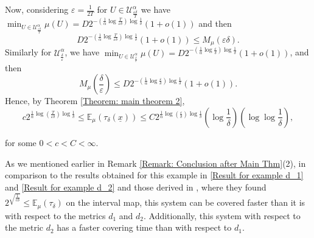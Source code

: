 \documentclass[11pt, reqno]{amsart}
\theoremstyle{plain}%
\theoremstyle{definition}
\theoremstyle{definition}
\def\U{\ensuremath{\mathcal U}}
\def\E{\mathbb E}
\def\ulx{\underline{x}}
\numberwithin{equation}{section}
\begin{document}
Now, considering $\varepsilon=\frac{1}{2T}$ for $U\in\U_{\frac{\varepsilon\delta}{T}}^\alpha$ we have $\min_{ U\in\U_{\frac{\varepsilon\delta}{T}}^\alpha} \mu(U)= D2^{-\left(\frac{1}{\alpha}\log\frac{T}{\varepsilon\delta}\right)\log\frac{1}{\delta}}(1+o(1))$ and then $$D2^{-\left(\frac{1}{\alpha}\log\frac{T}{\varepsilon\delta}\right)\log\frac{1}{\delta}}(1+o(1))\le M_\mu\left(\varepsilon\delta\right).$$
Similarly for $\U_{\frac{\delta}{\varepsilon}}^\alpha$, we have $\min_{U\in\U_{\frac{\delta}{\varepsilon}}^\alpha}\mu(U)= D2^{-\left(\frac{1}{\alpha}\log\frac{\varepsilon}{\delta}\right)\log\frac{1}{\delta}}(1+o(1))$, and then
$$  M_\mu\left(\frac{\delta}{\varepsilon}\right)\le  D2^{-\left(\frac{1}{\alpha}\log\frac{\varepsilon}{\delta}\right)\log\frac{1}{\delta}}(1+o(1)).$$
 Hence, by Theorem \ref{Theorem: main theorem 2}, 
 \begin{equation}\label{Result for example d_2}
 c2^{\frac{1}{\alpha}\log\left(\frac{T}{\varepsilon\delta}\right)\log\frac{1}{\delta}}\le \E_{\mu}(\tau_\delta(\ulx))\le C 2^{\frac{1}{\alpha}\log\left(\frac{\varepsilon}{\delta}\right)\log\frac{1}{\delta}} \left(\log \frac{1}{\delta}\right)\left(\log\log \frac{1}{\delta}\right),\end{equation} 

for some $0<c<C<\infty$.


 As we mentioned earlier in Remark \ref{Remark: Conclusion after Main Thm}(2), in comparison to the results obtained for this example in \eqref{Result for example d_1} and \eqref{Result for example d_2} and those derived in \cite[Example 7.4]{MikeNatali}, where they found $2^{\sqrt{\frac{1}{c\delta}}}\le \E_{\mu}(\tau_\delta) $ on the interval map, this system can be covered faster than it is with respect to the metrics $d_1$ and $d_2$. Additionally, this system with respect to the metric $d_2$ has a faster covering time than with respect to $d_1$.


\end{document}
